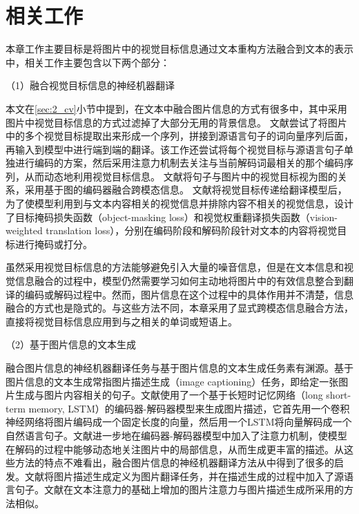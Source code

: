 \section{相关工作}



% 

本章工作主要目标是将图片中的视觉目标信息通过文本重构方法融合到文本的表示中，相关工作主要包含以下两个部分：

{\sffamily （1）融合视觉目标信息的神经机器翻译}

本文在\ref{sec:2_cv}小节中提到，在文本中融合图片信息的方式有很多中，其中采用图片中视觉目标信息的方式过滤掉了大部分无用的背景信息。
文献\cite{35_huang-etal-2016-attention}尝试了将图片中的多个视觉目标提取出来形成一个序列，拼接到源语言句子的词向量序列后面，再输入到模型中进行端到端的翻译。该工作还尝试将每个视觉目标与源语言句子单独进行编码的方案，然后采用注意力机制去关注与当前解码词最相关的那个编码序列，从而动态地利用视觉目标信息。
文献\cite{33_yin-etal-2020-novel}将句子与图片中的视觉目标视为图的关系，采用基于图的编码器融合跨模态信息。
文献\cite{48_DBLP:conf/aaai/WangX21}将视觉目标传递给翻译模型后，为了使模型利用到与文本内容相关的视觉信息并排除内容不相关的视觉信息，设计了目标掩码损失函数（object-masking loss）和视觉权重翻译损失函数（vision-weighted translation loss），分别在编码阶段和解码阶段针对文本的内容将视觉目标进行掩码或打分。

虽然采用视觉目标信息的方法能够避免引入大量的噪音信息，但是在文本信息和视觉信息融合的过程中，模型仍然需要学习如何主动地将图片中的有效信息整合到翻译的编码或解码过程中。然而，图片信息在这个过程中的具体作用并不清楚，信息融合的方式也是隐式的。与这些方法不同，本章采用了显式跨模态信息融合方法，直接将视觉目标信息应用到与之相关的单词或短语上。

{\sffamily （2）基于图片信息的文本生成}

融合图片信息的神经机器翻译任务与基于图片信息的文本生成任务素有渊源。基于图片信息的文本生成常指图片描述生成（image captioning）任务，即给定一张图片生成与图片内容相关的句子。文献\cite{66_DBLP:conf/cvpr/VinyalsTBE15}使用了一个基于长短时记忆网络（long short-term memory, LSTM）的编码器-解码器模型来生成图片描述，它首先用一个卷积神经网络将图片编码成一个固定长度的向量，然后用一个LSTM将向量解码成一个自然语言句子。文献\cite{67_DBLP:conf/icml/XuBKCCSZB15,69_DBLP:conf/cvpr/LuXPS17}进一步地在编码器-解码器模型中加入了注意力机制，使模型在解码的过程中能够动态地关注图片中的局部信息，从而生成更丰富的描述。从这些方法的特点不难看出，融合图片信息的神经机器翻译方法从中得到了很多的启发。文献\cite{68_DBLP:journals/corr/KirosSZ14}将图片描述生成定义为图片翻译任务，并在描述生成的过程中加入了源语言句子。文献\cite{36_calixto-etal-2017-doubly}在文本注意力的基础上增加的图片注意力与图片描述生成所采用的方法相似。

